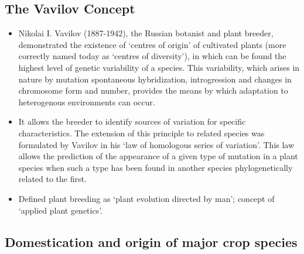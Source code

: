 \documentclass[ignorenonframetext,aspectratio=169]{beamer}
\begin{document}
\hypertarget{the-vavilov-concept}{%
\subsection{The Vavilov Concept}\label{the-vavilov-concept}}

\begin{frame}{}
\protect\hypertarget{section-7}{}

\begin{itemize}
\item
  Nikolai I. Vavilov (1887-1942), the Russian botanist and plant
  breeder, demonstrated the existence of `centres of origin' of
  cultivated plants (more correctly named today as `centres of
  diversity'), in which can be found the highest level of genetic
  variability of a species. This variability, which arises in nature by
  mutation spontaneous hybridization, introgression and changes in
  chromosome form and number, provides the means by which adaptation to
  heterogenous environments can occur.
\item
  It allows the breeder to identify sources of variation for specific
  characteristics. The extension of this principle to related species
  was formulated by Vavilov in his `law of homologous series of
  variation'. This law allows the prediction of the appearance of a
  given type of mutation in a plant species when such a type has been
  found in another species phylogenetically related to the first.
\item
  Defined plant breeding as `plant evolution directed by man'; concept
  of `applied plant genetics'.
\end{itemize}

\end{frame}

\hypertarget{domestication-and-origin-of-major-crop-species}{%
\subsection{Domestication and origin of major crop
species}\label{domestication-and-origin-of-major-crop-species}}
\end{document}
